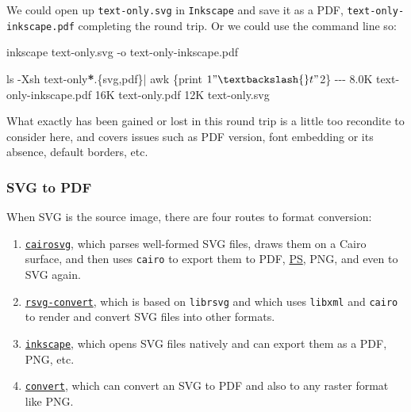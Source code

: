 \documentclass[
  11pt,
  british,
  a4paper,
]{article}
\newenvironment{Shaded}{\begin{snugshade}}{\end{snugshade}}
\newcommand{\AttributeTok}[1]{\textcolor[rgb]{0.80,0.80,0.80}{#1}}
\newcommand{\DataTypeTok}[1]{\textcolor[rgb]{0.87,0.87,0.75}{#1}}
\newcommand{\ExtensionTok}[1]{\textcolor[rgb]{0.80,0.80,0.80}{#1}}
\newcommand{\FunctionTok}[1]{\textcolor[rgb]{0.94,0.94,0.56}{#1}}
\newcommand{\KeywordTok}[1]{\textcolor[rgb]{0.94,0.87,0.69}{#1}}
\newcommand{\NormalTok}[1]{\textcolor[rgb]{0.80,0.80,0.80}{#1}}
\newcommand{\OperatorTok}[1]{\textcolor[rgb]{0.94,0.94,0.82}{#1}}
\newcommand{\PreprocessorTok}[1]{\textcolor[rgb]{1.00,0.81,0.69}{\textbf{#1}}}
\newcommand{\StringTok}[1]{\textcolor[rgb]{0.80,0.58,0.58}{#1}}
\begin{document}
We could open up \texttt{text-only.svg} in \texttt{Inkscape} and save it
as a PDF, \texttt{text-only-inkscape.pdf} completing the round trip. Or
we could use the command line so:

\begin{Shaded}
\begin{Highlighting}[]
\ExtensionTok{inkscape}\NormalTok{ text{-}only.svg }\AttributeTok{{-}o}\NormalTok{ text{-}only{-}inkscape.pdf}

\FunctionTok{ls} \AttributeTok{{-}Xsh}\NormalTok{ text{-}only}\PreprocessorTok{*}\NormalTok{.}\DataTypeTok{\{svg}\OperatorTok{,}\DataTypeTok{pdf\}}\KeywordTok{|} \FunctionTok{awk} \StringTok{\textquotesingle{}\{print $1 "\textbackslash{}t" $2\}\textquotesingle{}}
\ExtensionTok{{-}{-}{-}}
\ExtensionTok{8.0K}\NormalTok{    text{-}only{-}inkscape.pdf}
\ExtensionTok{16K}\NormalTok{     text{-}only.pdf}
\ExtensionTok{12K}\NormalTok{     text{-}only.svg}
\end{Highlighting}
\end{Shaded}

What exactly has been gained or lost in this round trip is a little too
recondite to consider here, and covers issues such as PDF version, font
embedding or its absence, default borders, etc.

\hypertarget{svg-to-pdf}{%
\subsubsection{SVG to PDF}\label{svg-to-pdf}}

When SVG is the source image, there are four routes to format
conversion:

\begin{enumerate}
\item
  \href{https://cairosvg.org/}{\texttt{cairosvg}}, which parses
  well-formed SVG files, draws them on a Cairo surface, and then uses
  \texttt{cairo} to export them to PDF,
  \href{https://techterms.com/definition/postscript}{PS}, PNG, and even
  to SVG again.
\item
  \href{https://en.wikipedia.org/wiki/Librsvg}{\texttt{rsvg-convert}},
  which is based on \texttt{librsvg} and which uses \texttt{libxml} and
  \texttt{cairo} to render and convert SVG files into other formats.
\item
  \href{https://inkscape.org/}{\texttt{inkscape}}, which opens SVG files
  natively and can export them as a PDF, PNG, etc.
\item
  \href{https://imagemagick.org/script/convert.php}{\texttt{convert}},
  which can convert an SVG to PDF and also to any raster format like
  PNG.
\end{enumerate}
\end{document}
